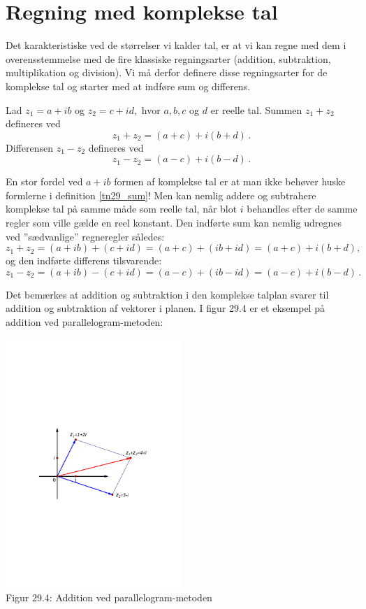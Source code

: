 \section{Regning med komplekse tal}
Det karakteristiske ved de størrelser vi kalder tal, er at vi kan regne med dem i over\-ensstemmelse
med de fire klassiske regningsarter (addition, subtraktion, multiplikation og division).
Vi må derfor definere disse regningsarter for de komplekse tal og starter med at indføre
sum og differens.
 
\begin{definition}\label{tn29_sum}
Lad $z_1=a+ib$ og $z_2=c+id,$ hvor $a,b,c$ og $d$ er reelle tal.\bs
Summen $z_1+z_2$ defineres ved
\begin{equation}\label{tn29_sum1}
z_1+z_2=(a+c)+i(b+d)\,.
\end{equation}
Differensen $z_1-z_2$ defineres ved
\begin{equation}\label{tn29_sum2}
z_1-z_2=(a-c)+i(b-d)\,.
\end{equation}
\end{definition}
\begin{aha}
En stor fordel ved $a+ib$ formen af komplekse tal er at man ikke behøver huske formlerne i definition \ref{tn29_sum}! Men kan nemlig addere og subtrahere komplekse tal på samme måde som reelle tal, når blot $i$ behandles efter de samme regler som ville gælde en reel konstant. Den indførte sum kan nemlig udregnes ved ''sædvanlige'' regneregler således:
$$z_1+z_2=(a+ib)+(c+id)=(a+c)+(ib+id)=(a+c)+i(b+d),$$
og den indførte differens tilsvarende:
$$z_1-z_2=(a+ib)-(c+id)=(a-c)+(ib-id)=(a-c)+i(b-d)\,.$$
\end{aha}
\begin{example}
Det bemærkes at addition og subtraktion i den komplekse talplan svarer til addition og subtraktion af vektorer i planen. I figur 29.4 er et eksempel på addition ved parallelogram-metoden:
\begin{center}
	\includegraphics[trim=3cm 9cm 3cm 10cm,width=0.5\textwidth,clip]{Geometer/KompleksPlan4.pdf}\\
Figur 29.4: Addition ved parallelogram-metoden 
\end{center}
\end{example}


